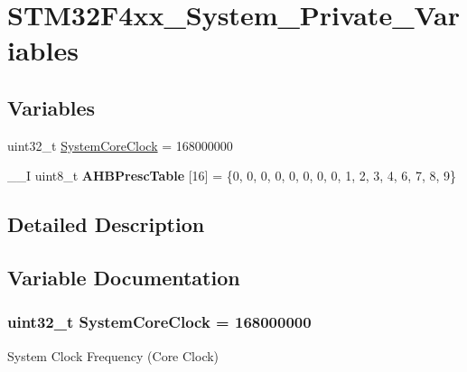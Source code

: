 \hypertarget{group___s_t_m32_f4xx___system___private___variables}{\section{S\-T\-M32\-F4xx\-\_\-\-System\-\_\-\-Private\-\_\-\-Variables}
\label{group___s_t_m32_f4xx___system___private___variables}
}
\subsection*{Variables}
\begin{DoxyCompactItemize}
\item 
uint32\-\_\-t \hyperlink{group___s_t_m32_f4xx___system___private___variables_gaa3cd3e43291e81e795d642b79b6088e6}{System\-Core\-Clock} = 168000000
\item 
\hypertarget{group___s_t_m32_f4xx___system___private___variables_gacdc3ef54c0704c90e69a8a84fb2d970d}{\-\_\-\-\_\-\-I uint8\-\_\-t {\bfseries A\-H\-B\-Presc\-Table} \mbox{[}16\mbox{]} = \{0, 0, 0, 0, 0, 0, 0, 0, 1, 2, 3, 4, 6, 7, 8, 9\}}\label{group___s_t_m32_f4xx___system___private___variables_gacdc3ef54c0704c90e69a8a84fb2d970d}

\end{DoxyCompactItemize}


\subsection{Detailed Description}


\subsection{Variable Documentation}
\hypertarget{group___s_t_m32_f4xx___system___private___variables_gaa3cd3e43291e81e795d642b79b6088e6}{
\subsubsection[{System\-Core\-Clock}]{\setlength{\rightskip}{0pt plus 5cm}uint32\-\_\-t System\-Core\-Clock = 168000000}}\label{group___s_t_m32_f4xx___system___private___variables_gaa3cd3e43291e81e795d642b79b6088e6}
System Clock Frequency (Core Clock) 